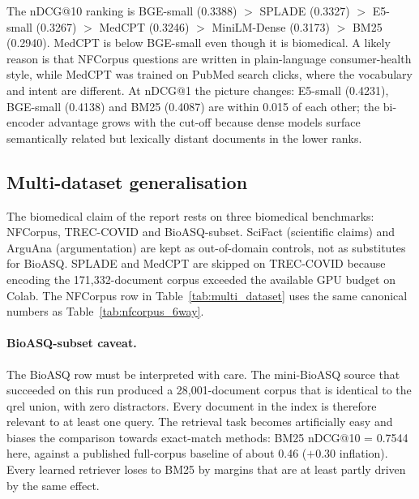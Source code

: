\documentclass[11pt,a4paper]{article}
\begin{document}
The nDCG@10 ranking is BGE-small (0.3388) $>$ SPLADE (0.3327) $>$
E5-small (0.3267) $>$ MedCPT (0.3246) $>$ MiniLM-Dense (0.3173) $>$ BM25
(0.2940). MedCPT is below BGE-small even though it is biomedical.
A likely reason is that NFCorpus questions are written in
plain-language consumer-health style, while MedCPT was trained on
PubMed search clicks, where the vocabulary and intent are different.
At nDCG@1 the picture changes: E5-small (0.4231), BGE-small (0.4138)
and BM25 (0.4087) are within 0.015 of each other; the bi-encoder
advantage grows with the cut-off because dense models surface
semantically related but lexically distant documents in the lower
ranks.

\subsection{Multi-dataset generalisation}
\label{subsec:multi}

The biomedical claim of the report rests on three biomedical
benchmarks: NFCorpus, TREC-COVID and BioASQ-subset. SciFact (scientific
claims) and ArguAna (argumentation) are kept as out-of-domain controls,
not as substitutes for BioASQ. SPLADE and MedCPT are skipped on
TREC-COVID because encoding the 171{,}332-document corpus exceeded the
available GPU budget on Colab. The NFCorpus row in
Table~\ref{tab:multi_dataset} uses the same canonical numbers as
Table~\ref{tab:nfcorpus_6way}.

\begin{table}[ht]
    \centering
    \caption{nDCG@10 across all retrievers and datasets. The best result
    per row is in bold. Cells marked ``--'' on TREC-COVID denote runs
    skipped due to the available compute budget. The dagger ($\dagger$)
    on BioASQ-subset marks a degenerate-corpus row that is kept as a
    stress case and not used as biomedical evidence
    (see Section~\ref{subsec:multi}).}
    \label{tab:multi_dataset}
    \small
    
\end{table}

\paragraph{BioASQ-subset caveat.}
The BioASQ row must be interpreted with care. The mini-BioASQ source
that succeeded on this run produced a 28{,}001-document corpus that is
identical to the qrel union, with zero distractors. Every document in
the index is therefore relevant to at least one query. The retrieval
task becomes artificially easy and biases the comparison towards
exact-match methods: BM25 nDCG@10 = 0.7544 here, against a published
full-corpus baseline of about 0.46 ($+0.30$ inflation). Every learned
retriever loses to BM25 by margins that are at least partly driven by
the same effect.
\end{document}
